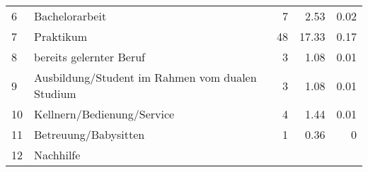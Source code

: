 \begin{longtable}{lXrrr}
     6 &
     \multicolumn{1}{X}{ Bachelorarbeit   } &


       \num{7} &
       \num[round-mode=places,round-precision=2]{2,53} &
         \num[round-mode=places,round-precision=2]{0,02} \\

     7 &
     \multicolumn{1}{X}{ Praktikum   } &


       \num{48} &
       \num[round-mode=places,round-precision=2]{17,33} &
         \num[round-mode=places,round-precision=2]{0,17} \\

     8 &
     \multicolumn{1}{X}{ bereits gelernter Beruf   } &


       \num{3} &
       \num[round-mode=places,round-precision=2]{1,08} &
         \num[round-mode=places,round-precision=2]{0,01} \\

     9 &
     \multicolumn{1}{X}{ Ausbildung/Student im Rahmen vom dualen Studium   } &


       \num{3} &
       \num[round-mode=places,round-precision=2]{1,08} &
         \num[round-mode=places,round-precision=2]{0,01} \\

     10 &
     \multicolumn{1}{X}{ Kellnern/Bedienung/Service   } &


       \num{4} &
       \num[round-mode=places,round-precision=2]{1,44} &
         \num[round-mode=places,round-precision=2]{0,01} \\

     11 &
     \multicolumn{1}{X}{ Betreuung/Babysitten   } &


       \num{1} &
       \num[round-mode=places,round-precision=2]{0,36} &
         \num[round-mode=places,round-precision=2]{0} \\

     12 &
     \multicolumn{1}{X}{ Nachhilfe   } &



\end{longtable}
